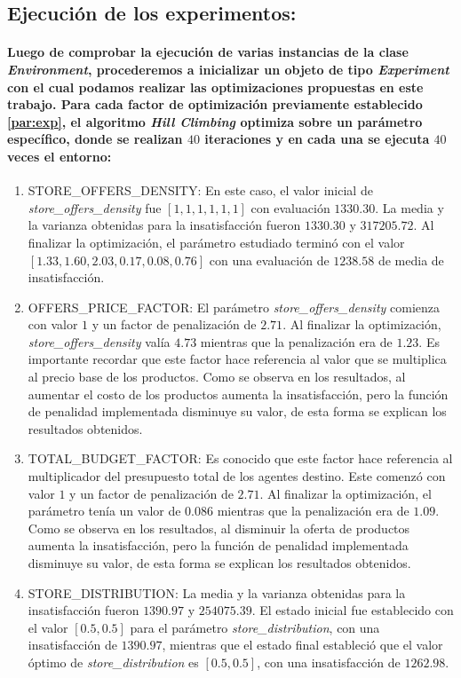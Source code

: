 \documentclass[12pt]{amsart}
\begin{document}
\vskip 5cm

\subsection{Ejecución de los experimentos:}

\paragraph{Luego de comprobar la ejecución de varias instancias de la clase \textit{Environment}, procederemos a inicializar un objeto de tipo \textit{Experiment} con el cual podamos realizar las optimizaciones propuestas en este trabajo. Para cada factor de optimización previamente establecido \ref{par:exp}, el algoritmo \textit{Hill Climbing} optimiza sobre un parámetro específico, donde se realizan $40$ iteraciones y en cada una se ejecuta $40$ veces el entorno:}

\begin {enumerate}
				\item {STORE\_OFFERS\_DENSITY:  En este caso, el valor inicial de \textit{store\_offers\_density} fue $[1, 1, 1, 1, 1, 1]$ con evaluación $1330.30$. La media y la varianza obtenidas para la insatisfacción fueron $1330.30$ y $317205.72$. Al finalizar la optimización, el parámetro estudiado terminó con el valor $[1.33, 1.60, 2.03, 0.17, 0.08, 0.76]$ con una evaluación de $1238.58$ de media de insatisfacción.}
				\item {OFFERS\_PRICE\_FACTOR: El parámetro \textit{store\_offers\_density} comienza con valor $1$ y un factor de penalización de $2.71$. Al finalizar la optimización, \textit{store\_offers\_density} valía $4.73$ mientras que la penalización era de $1.23$. Es importante recordar que este factor hace referencia al valor que se multiplica al precio base de los productos. Como se observa en los resultados, al aumentar el costo de los productos aumenta la insatisfacción, pero la función de penalidad implementada disminuye su valor, de esta forma se explican los resultados obtenidos.}
				\item {TOTAL\_BUDGET\_FACTOR: Es conocido que este factor hace referencia al multiplicador del presupuesto total de los agentes destino. Este comenzó con valor $1$ y un factor de penalización de $2.71$. Al finalizar la optimización, el parámetro tenía un valor de $0.086$ mientras que la penalización era de $1.09$. Como se observa en los resultados, al disminuir la oferta de productos aumenta la insatisfacción, pero la función de penalidad implementada disminuye su valor, de esta forma se explican los resultados obtenidos.}
				\item {STORE\_DISTRIBUTION: La media y la varianza obtenidas para la insatisfacción fueron $1390.97$ y $254075.39$. El estado inicial fue establecido con el valor $[0.5, 0.5]$ para el parámetro \textit{store\_distribution}, con una insatisfacción de $1390.97$, mientras que el estado final estableció que el valor óptimo de \textit{store\_distribution} es $[0.5, 0.5]$, con una insatisfacción de $1262.98$.}
\end {enumerate}
\end{document}
